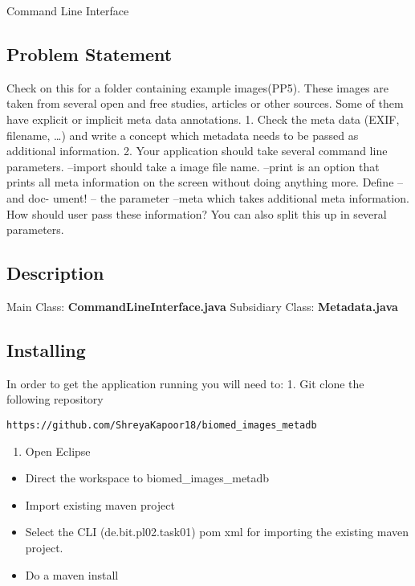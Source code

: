 Command Line Interface

\hypertarget{problem-statement}{%
\subsection{Problem Statement}\label{problem-statement}}

Check on this for a folder containing example images(PP5). These images
are taken from several open and free studies, articles or other sources.
Some of them have explicit or implicit meta data annotations. 1. Check
the meta data (EXIF, filename, \ldots{}) and write a concept which
metadata needs to be passed as additional information. 2. Your
application should take several command line parameters. --import should
take a image file name. --print is an option that prints all meta
information on the screen without doing anything more. Define -- and
doc- ument! -- the parameter --meta which takes additional meta
information. How should user pass these information? You can also split
this up in several parameters.

\hypertarget{description}{%
\subsection{Description}\label{description}}

Main Class: \textbf{CommandLineInterface.java} Subsidiary Class:
\textbf{Metadata.java}

\hypertarget{installing}{%
\subsection{Installing}\label{installing}}

In order to get the application running you will need to: 1. Git clone
the following repository

\begin{verbatim}
https://github.com/ShreyaKapoor18/biomed_images_metadb
\end{verbatim}

\begin{enumerate}
\def\labelenumi{\arabic{enumi}.}
\setcounter{enumi}{1}
\tightlist
\item
  Open Eclipse
\end{enumerate}

\begin{itemize}
\tightlist
\item
  Direct the workspace to biomed\_images\_metadb
\item
  Import existing maven project
\item
  Select the CLI (de.bit.pl02.task01) pom xml for importing the existing
  maven project.
\item
  Do a maven install
\end{itemize}

